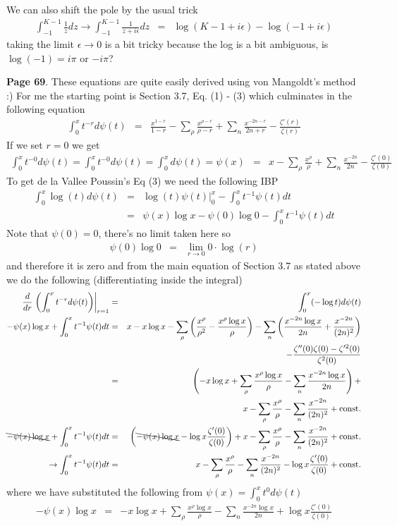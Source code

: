 \documentclass[aps,preprint,preprintnumbers,nofootinbib,showpacs,prd]{revtex4-1}
\newcommand{\nbea}{\begin{eqnarray*}}
\newcommand{\neea}{\end{eqnarray*}}
\begin{document}
We can also shift the pole by the usual trick
%
\nbea
\int_{-1}^{K-1} \frac{1}{z} dz \to \int_{-1}^{K-1} \frac{1}{z + i\epsilon} dz & = & \log (K - 1 + i\epsilon) - \log(-1 + i\epsilon)
\neea
%
taking the limit $\epsilon\to0$ is a bit tricky because the log is a bit ambiguous, is $\log (-1) = i \pi$ or $-i\pi$?

{\bf Page 69}. These equations are quite easily derived using von Mangoldt's method :) For me the starting point is Section 3.7, Eq. (1) - (3) which culminates in the following equation 
%
\nbea
\int_0^x t^{-r} d\psi(t) & = & \frac{x^{1-r}}{1-r} - \sum_\rho \frac{x^{\rho-r}}{\rho-r} + \sum_n \frac{x^{-2n-r}}{2n+r} - \frac{\zeta'(r)}{\zeta(r)}
\neea
%
If we set $r=0$ we get
%
\nbea
\int_0^x t^{-0} d\psi(t) = \int_0^x t^{-0} d\psi(t) = \int_0^x d\psi(t) = \psi(x) & = & x - \sum_\rho \frac{x^{\rho}}{\rho} + \sum_n \frac{x^{-2n}}{2n} - \frac{\zeta'(0)}{\zeta(0)}
\neea
%
To get de la Vallee Poussin's Eq (3) we need the following IBP 
%
\nbea
\int_0^x \log(t) d\psi(t) & = & \left. \log(t) \psi(t) \right|_0^x - \int_0^x t^{-1} \psi(t) dt \\
& = & \psi(x) \log x - \psi(0)\log0 - \int_0^x t^{-1} \psi(t) dt
\neea
%
Note that $\psi(0) = 0$, there's no limit taken here so
%
\nbea
\psi(0)\log0 & = & \lim_{r\to0} 0 \cdot \log(r)
\neea
%
and therefore it is zero and from the main equation of Section 3.7 as stated above we do the following (differentiating inside the integral)
%
\nbea
\frac{d}{dr}\left.\left(\int_0^x t^{-r} d\psi(t)\right)\right|_{r = 1} & = & \int_0^x (-\log t) d\psi(t)\\
-\psi(x)\log x + \int_0^{x} t^{-1} \psi(t) dt & = & x - x\log x - \sum_\rho \left( \frac{x^\rho}{\rho^2} - \frac{x^\rho \log x}{\rho}\right) - \sum_n \left(\frac{x^{-2n}\log x}{2n} + \frac{x^{-2n}}{(2n)^2}\right) \\
&& - \frac{\zeta''(0)\zeta(0) - \zeta'^2(0)}{\zeta^2(0)} \\
& = & \left ( -x\log x + \sum_\rho \frac{x^{\rho} \log x}{\rho} - \sum_n \frac{x^{-2n} \log x}{2n} \right) + \\
&& x -\sum_\rho \frac{x^\rho}{\rho} - \sum_n \frac{x^{-2n}}{(2n)^2} + {\rm const.} \\
\bcancel{-\psi(x)\log x} + \int_0^{x} t^{-1} \psi(t) dt & = & \left ( \bcancel{-\psi(x) \log x} - \log x\frac{\zeta'(0)}{\zeta(0)} \right ) + x -\sum_\rho \frac{x^\rho}{\rho} - \sum_n \frac{x^{-2n}}{(2n)^2} + {\rm const.} \\
\to \int_0^{x} t^{-1} \psi(t) dt & = & x -\sum_\rho \frac{x^\rho}{\rho} - \sum_n \frac{x^{-2n}}{(2n)^2} - \log x\frac{\zeta'(0)}{\zeta(0)} + {\rm const.}
\neea
%
where we have substituted the following from $\psi(x) = \int_0^x t^{0} d\psi(t)$
%
\nbea
-\psi(x)\log x & = & -x \log x + \sum_\rho \frac{x^{\rho} \log x}{\rho} - \sum_n \frac{x^{-2n} \log x}{2n} + \log x \frac{\zeta'(0)}{\zeta(0)}
\neea
%
\end{document}
